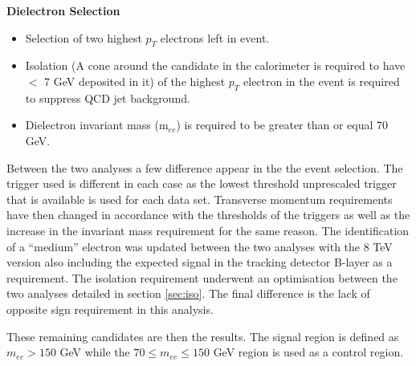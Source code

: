 	{\bf Dielectron Selection}
	\begin{itemize}
	\item Selection of two highest $p_{T}$ electrons left in event.
	\item Isolation (A cone around the candidate in the calorimeter is required to have $<$ 7 GeV deposited in it) of the highest $p_{T}$ electron in the event is required to suppress QCD jet background. 
	\item Dielectron invariant mass (m$_{ee}$) is required to be greater than or equal 70 GeV.
	\end{itemize}

	Between the two analyses a few difference appear in the the event selection. The trigger used is different in each case as the lowest threshold unprescaled trigger that is available is used for each data set. Transverse momentum requirements have then changed in accordance with the thresholds of the triggers as well as the increase in the invariant mass requirement for the same reason. The identification of a ``medium'' electron was updated between the two analyses with the 8 TeV version also including the expected signal in the tracking detector B-layer as a requirement. The isolation requirement underwent an optimisation between the two analyses detailed in section \ref{sec:iso}. The final difference is the lack of opposite sign requirement in this analysis.

	These remaining candidates are then the results. The signal region is defined as $m_{ee} > 150$ GeV while the $70 \leq m_{ee} \leq 150$ GeV region is used as a control region.

